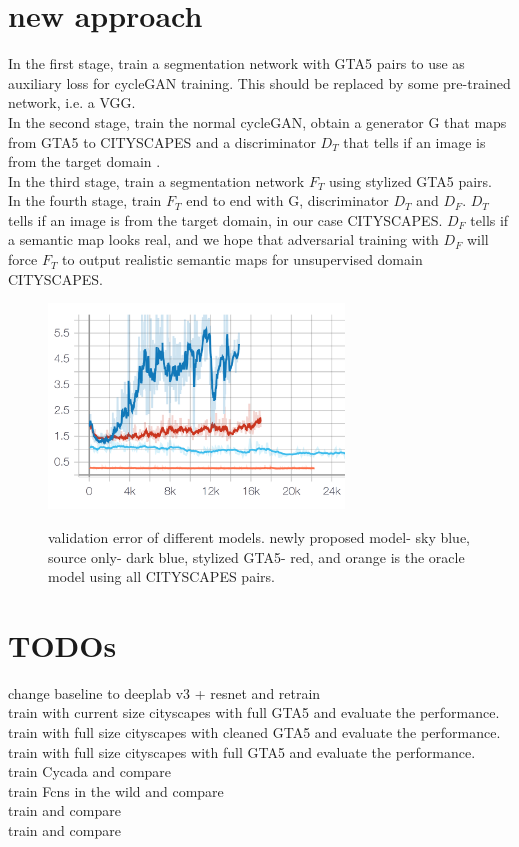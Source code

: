 \documentclass{article}
\begin{document}
\section*{new approach}
In the first stage, train a segmentation network with GTA5 pairs to use as auxiliary loss for cycleGAN training. This should be replaced by some pre-trained network, i.e. a VGG.\\
In the second stage, train the normal cycleGAN, obtain a generator G that maps from GTA5 to CITYSCAPES and a discriminator $D_T$ that tells if an image is from the target domain .\\
In the third stage, train a segmentation network $F_T$ using stylized GTA5 pairs.\\
In the fourth stage, train $F_T$ end to end with G, discriminator $D_T$ and $D_F$. $D_T$ tells if an image is from the target domain, in our case CITYSCAPES. $D_F$ tells if a semantic map looks real, and we hope that adversarial training with $D_F$ will force $F_T$ to output realistic semantic maps for unsupervised domain CITYSCAPES.

\begin{figure}[H]
    \centering
\includegraphics[width=0.7\textwidth]{figures/syn_tran_base.png}\\
\caption{validation error of different models. newly proposed model- sky blue, source only- dark blue, stylized GTA5- red, and orange is the oracle model using all CITYSCAPES pairs.}
\end{figure}


\section*{TODOs}
change baseline to deeplab v3 + resnet and retrain\\
train with current size cityscapes with full GTA5 and evaluate the performance.\\
train with full size cityscapes with cleaned GTA5 and evaluate the performance.\\
train with full size cityscapes with full GTA5 and evaluate the performance.\\
train Cycada \cite{hoffman2017cycada} and compare\\
train Fcns in the wild \cite{hoffman2016fcns} and compare\\
train \cite{tsai2018learning} and compare\\
train \cite{Chen_2018_CVPR} and compare
\end{document}
